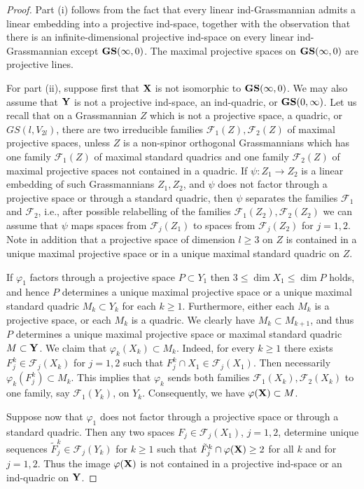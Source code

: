 \documentclass[12pt]{amsart}
\def\mc {\mathcal}
\begin{document}
\begin{proof}
Part (i) follows from the fact that every linear ind-Grassmannian admits a linear embedding into a projective ind-space, together with the observation that there is an infinite-dimensional projective ind-space on every linear ind-Grassmannian except ${\bf GS}(\infty,0)$. The maximal projective spaces on ${\bf GS}(\infty,0)$ are projective lines.

For part (ii), suppose first that ${\bf X}$ is not isomorphic to ${\bf GS}(\infty,0)$. We may also assume that ${\bf Y}$ is not a projective ind-space, an ind-quadric, or ${\bf GS}(0,\infty)$. Let us recall that on a Grassmannian $Z$ which is not a projective space, a quadric, or $GS(l,V_{2l})$, there are two irreducible families $\mc F_1(Z),\mc F_2(Z)$ of maximal projective spaces, unless $Z$ is a non-spinor orthogonal Grassmannians which has one family $\mc F_1(Z)$ of maximal standard quadrics and one family $\mc F_2(Z)$ of maximal projective spaces not contained in a quadric. If $\psi:Z_1\to Z_2$ is a linear embedding of such Grassmannians $Z_1,Z_2$, and $\psi$ does not factor through a projective space or through a standard quadric, then $\psi$ separates the families $\mc F_1$ and $\mc F_2$, i.e., after possible relabelling of the families $\mc F_1(Z_2),\mc F_2(Z_2)$ we can assume that $\psi$ maps spaces from $\mc F_j(Z_1)$ to spaces from $\mc F_j(Z_2)$ for $j=1,2$. Note in addition that a projective space of dimension $l\geq 3$ on $Z$ is contained in a unique maximal projective space or in a unique maximal standard quadric on $Z$. 

If $\varphi_1$ factors through a projective space $P\subset Y_1$ then $3\leq \dim X_1\leq\dim P$ holds, and hence $P$ determines a unique maximal projective space or a unique maximal standard quadric $M_k\subset Y_k$ for each $k\geq 1$. Furthermore, either each $M_k$ is a projective space, or each $M_k$ is a quadric. We clearly have $M_k\subset M_{k+1}$, and thus $P$ determines a unique maximal projective space or maximal standard quadric $M\subset {\bf Y}$. We claim that $\varphi_k(X_k)\subset M_k$. Indeed, for every $k\geq 1$ there exists $F^k_j\in\mc F_j(X_k)$ for $j=1,2$ such that $F^k_j\cap X_1\in \mc F_j(X_1)$. Then necessarily $\varphi_k(F^k_j)\subset M_k$. This implies that $\varphi_k$ sends both families $\mc F_1(X_k),\mc F_2(X_k)$ to one family, say $\mc F_1(Y_k)$, on $Y_k$. Consequently, we have $\varphi({\bf X})\subset M$. 

Suppose now that $\varphi_1$ does not factor through a projective space or through a standard quadric. Then any two spaces $F_j\in \mc F_j(X_1)$, $j=1,2$, determine unique sequences $\tilde F_j^k\in\mc F_j(Y_k)$ for $k\geq 1$ such that $\tilde F_j^k\cap \varphi({\bf X})\geq 2$ for all $k$ and for $j=1,2$. Thus the image $\varphi({\bf X})$ is not contained in a projective ind-space or an ind-quadric on ${\bf Y}$.


\end{proof}
\end{document}
